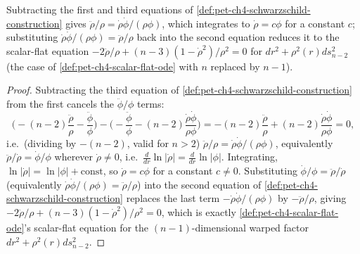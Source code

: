\begin{proposition}
  \label{prop:pet-ch4-schwarzschild-reduces-scalar-flat}
  \leanok
  Subtracting the first and third equations of
  \cref{def:pet-ch4-schwarzschild-construction} gives
  $\ddot\rho/\rho=\dot\rho\dot\phi/(\rho\phi)$, which integrates to
  $\dot\rho=c\phi$ for a constant $c$; substituting
  $\dot\rho\dot\phi/(\rho\phi)=\ddot\rho/\rho$ back into the second equation
  reduces it to the scalar-flat equation
  $-2\ddot\rho/\rho+(n-3)(1-\dot\rho^2)/\rho^2=0$ for $dr^2+\rho^2(r)ds_{n-2}^2$
  (the case of \cref{def:pet-ch4-scalar-flat-ode} with $n$ replaced by $n-1$).
\end{proposition}
\begin{proof}
  \leanok
  Subtracting the third equation of
  \cref{def:pet-ch4-schwarzschild-construction} from the first cancels the
  $\ddot\phi/\phi$ terms:
  \[
    \Big(-(n-2)\frac{\ddot\rho}\rho-\frac{\ddot\phi}\phi\Big)
    -\Big(-\frac{\ddot\phi}\phi-(n-2)\frac{\dot\rho\dot\phi}{\rho\phi}\Big)
    =-(n-2)\frac{\ddot\rho}\rho+(n-2)\frac{\dot\rho\dot\phi}{\rho\phi}=0,
  \]
  i.e.\ (dividing by $-(n-2)$, valid for $n>2$) $\ddot\rho/\rho=\dot\rho\dot\phi/(\rho\phi)$,
  equivalently $\ddot\rho/\dot\rho=\dot\phi/\phi$ wherever $\dot\rho\ne0$, i.e.\
  $\tfrac{d}{dr}\ln|\dot\rho|=\tfrac{d}{dr}\ln|\phi|$. Integrating,
  $\ln|\dot\rho|=\ln|\phi|+\text{const}$, so $\dot\rho=c\phi$ for a constant
  $c\ne0$. Substituting $\dot\phi/\phi=\ddot\rho/\dot\rho$ (equivalently
  $\dot\rho\dot\phi/(\rho\phi)=\ddot\rho/\rho$) into the second equation of
  \cref{def:pet-ch4-schwarzschild-construction} replaces the last term
  $-\dot\rho\dot\phi/(\rho\phi)$ by $-\ddot\rho/\rho$, giving
  $-2\ddot\rho/\rho+(n-3)(1-\dot\rho^2)/\rho^2=0$, which is exactly
  \cref{def:pet-ch4-scalar-flat-ode}'s scalar-flat equation for the
  $(n-1)$-dimensional warped factor $dr^2+\rho^2(r)ds_{n-2}^2$.
\end{proof}

